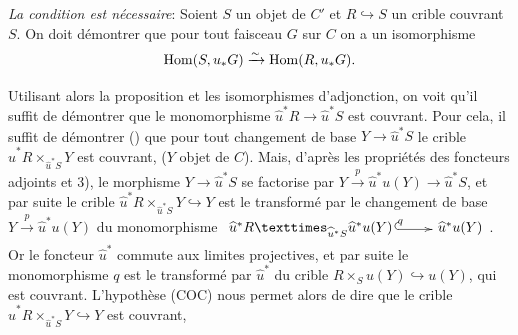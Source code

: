 \documentclass[10pt]{../fichiers-configuration-latex/smfart}
\begin{document}
\emph{La condition est nécessaire}: Soient $S$ un objet de $C'$
et $R\hookrightarrow S$ un crible couvrant $S$. On doit
démontrer que pour tout faisceau $G$ sur $C$ on a un
isomorphisme
$$
\operatorname{Hom}(S,u_{\ast}G)\xrightarrow{\sim} \operatorname{Hom}(R,u_{\ast}G){}.
$$

Utilisant alors la proposition  et les isomorphismes
d'adjonction, on voit qu'il suffit de démontrer que le monomorphisme
$\widehat{u}^{\ast}R\rightarrow \widehat{u}^{\ast}S$ est couvrant.
Pour cela, il suffit de démontrer () que pour tout
changement de base $Y\rightarrow \widehat{u}^{\ast}S$ le crible
$\widehat{u}^{\ast}R\times_{\widehat{u}^{\ast}S}Y$ est couvrant,
($Y$ objet de $C$). Mais, d'après les propriétés des foncteurs
adjoints et  3), le morphisme $Y\rightarrow
\widehat{u}^{\ast}S$ se factorise par
$Y\xrightarrow{p}\widehat{u}^{\ast}u(Y)\rightarrow
\widehat{u}^{\ast}S$, et par suite le crible
$\widehat{u}^{\ast}R\times_{\widehat{u}^{\ast}S}Y\hookrightarrow Y$
est le transformé par le changement de base
$Y\xrightarrow{p}\widehat{u}^{\ast}u(Y)$ du monomorphisme
$\xymatrix@1@M=.15cm{
\fprod{\hat{u}^{\ast}R}{\hat{u}^{\ast}u(Y)}{\hat{u}^{\ast}S}
\ar@{^{(}->}@<-1pt>[r]^(.6){q}&\hat{u}^{\ast}u(Y)}$.
 Or le foncteur $\widehat{u}^{\ast}$ commute aux limites projectives,
et par suite le monomorphisme $q$ est le transformé par
$\widehat{u}^{\ast}$ du crible $R\times_S u(Y)\hookrightarrow u(Y)$,
qui est couvrant. L'hypothèse (COC) nous permet alors de dire que
le crible
$\widehat{u}^{\ast}R\times_{\widehat{u}^{\ast}S}Y\hookrightarrow Y$
est couvrant, \cqfd
\end{document}
